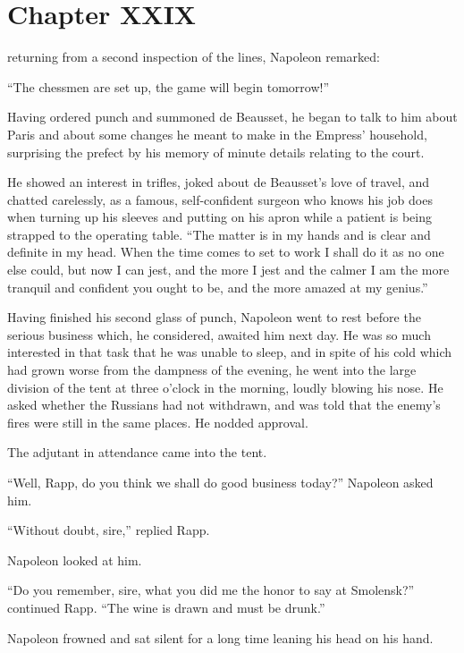 \chapter*{Chapter XXIX} \ifaudio {}
\fi

 returning from a second inspection of the lines, Napoleon
remarked:

``The chessmen are set up, the game will begin tomorrow!''

Having ordered punch and summoned de Beausset, he began to talk
to him about Paris and about some changes he meant to make in the
Empress' household, surprising the prefect by his memory of
minute details relating to the court.

He showed an interest in trifles, joked about de Beausset's love
of travel, and chatted carelessly, as a famous, self-confident
surgeon who knows his job does when turning up his sleeves and
putting on his apron while a patient is being strapped to the
operating table. ``The matter is in my hands and is clear and
definite in my head. When the time comes to set to work I shall
do it as no one else could, but now I can jest, and the more I
jest and the calmer I am the more tranquil and confident you
ought to be, and the more amazed at my genius.''

Having finished his second glass of punch, Napoleon went to rest
before the serious business which, he considered, awaited him
next day. He was so much interested in that task that he was
unable to sleep, and in spite of his cold which had grown worse
from the dampness of the evening, he went into the large division
of the tent at three o'clock in the morning, loudly blowing his
nose. He asked whether the Russians had not withdrawn, and was
told that the enemy's fires were still in the same places. He
nodded approval.

The adjutant in attendance came into the tent.

``Well, Rapp, do you think we shall do good business today?''
Napoleon asked him.

``Without doubt, sire,'' replied Rapp.

Napoleon looked at him.

``Do you remember, sire, what you did me the honor to say at
Smolensk?''  continued Rapp. ``The wine is drawn and must be
drunk.''

Napoleon frowned and sat silent for a long time leaning his head
on his hand.


